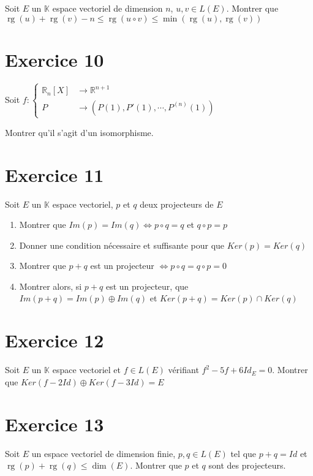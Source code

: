 \documentclass[11pt]{article}
\begin{document}
Soit $E$ un $\mathbb{K}$ espace vectoriel de dimension $n$, $u,v\in L(E)$. Montrer que $\operatorname{rg}(u) + \operatorname{rg}(v)-n\leq 
\operatorname{rg}(u\circ v) \leq \min(\operatorname{rg}(u),\operatorname{rg}(v))$

\section*{Exercice 10}


Soit $f:\begin{cases}
\mathbb{R}_n[X] & \to \mathbb{R}^{n+1} \\
P &\to (P(1),P'(1),\cdots,P^{(n)}(1))
\end{cases}$

Montrer qu'il s'agit d'un isomorphisme.

\section*{Exercice 11}

Soit $E$ un $\mathbb{K}$ espace vectoriel, $p$ et $q$ deux projecteurs de $E$
\begin{enumerate}
\item Montrer que $Im(p)=Im(q)\Leftrightarrow p\circ q = q$ et $q\circ p =p$
\item Donner une condition nécessaire et suffisante pour que $Ker(p)=Ker(q)$
\item Montrer que $p+q$ est un projecteur $\Leftrightarrow p\circ q= q\circ p = 0$
\item Montrer alors, si $p+q$ est un projecteur, que $Im(p+q)=Im(p)\oplus Im(q)$ et $Ker(p+q)=Ker(p)\cap Ker(q)$
\end{enumerate}

\section*{Exercice 12}

Soit $E$ un $\mathbb{K}$ espace vectoriel et $f\in L(E)$ vérifiant $f^2-5f+6Id_E=0$. Montrer que $Ker(f-2Id)\oplus Ker(f-3Id)=E$

\section*{Exercice 13}

Soit $E$ un espace vectoriel de dimension finie, $p,q\in L(E)$ tel que $p+q=Id$ et $\operatorname{rg}(p)+\operatorname{rg}(q)\leq \dim(E)$. Montrer que $p$ et $q$ sont des projecteurs.
\end{document}
